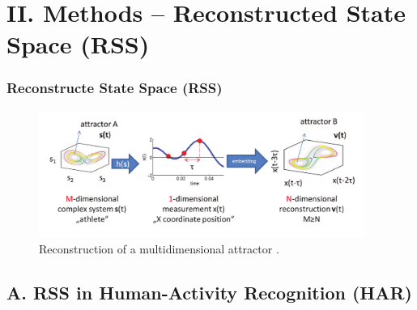 \documentclass{beamer}
\begin{document}
\section{II. Methods --  Reconstructed State Space (RSS)}





\begin{frame}
\frametitle{Reconstructe State Space (RSS)}
\vspace{-0.7cm}


\begin{figure}[!htb]
\centering
\includegraphics[width=0.95\textwidth]{Quintana-Duque2012_Fig1}
\caption[PA]{Reconstruction of a multidimensional attractor
 \textcolor{red}{\textbf{ \cite{Quintana-Duque2012} }}.
}
\label{fig:sn}
\end{figure}

\end{frame}



\subsection{A. RSS in Human-Activity Recognition (HAR) }


\end{document}
